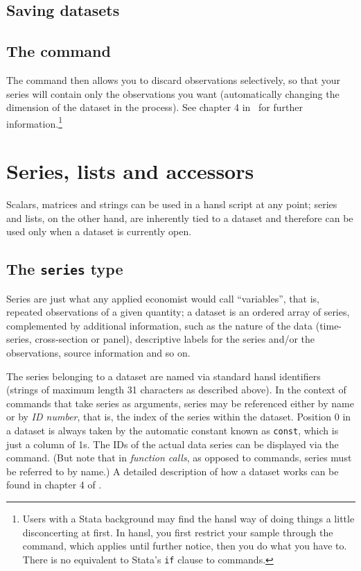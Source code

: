 \section{Saving datasets}

\section{The  command}

The  command then allows
you to discard observations selectively, so that your series will
contain only the observations you want (automatically changing the
dimension of the dataset in the process). See chapter 4 in \GUG\ for
further information.\footnote{Users with a Stata background may find
  the hansl way of doing things a little disconcerting at first. In
  hansl, you first restrict your sample through the 
  command, which applies until further notice, then you do what you
  have to. There is no equivalent to Stata's \texttt{if} clause to
  commands.}

\chapter{Series, lists and accessors}

Scalars, matrices and strings can be used in a hansl script at any
point; series and lists, on the other hand, are inherently tied to a
dataset and therefore can be used only when a dataset is currently
open.

\section{The \texttt{series} type}
\label{sec:series}
 
Series are just what any applied economist would call ``variables'',
that is, repeated observations of a given quantity; a dataset is an
ordered array of series, complemented by additional information,
such as the nature of the data (time-series, cross-section or panel),
descriptive labels for the series and/or the observations, source
information and so on.

The series belonging to a dataset are named via standard hansl
identifiers (strings of maximum length 31 characters as described
above). In the context of commands that take series as arguments,
series may be referenced either by name or by \emph{ID number}, that
is, the index of the series within the dataset. Position 0 in a
dataset is always taken by the automatic constant known as
\texttt{const}, which is just a column of 1s. The IDs of the actual
data series can be displayed via the  command. (But note
that in \textit{function calls}, as opposed to commands, series must
be referred to by name.)  A detailed description of how a dataset
works can be found in chapter 4 of \GUG.

